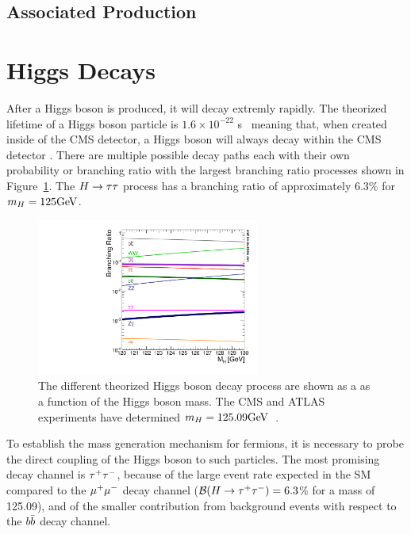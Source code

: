 \subsection{Associated Production}

\section{Higgs Decays}
\label{sec:higgs_decays}

After a Higgs boson is produced, it will decay extremly rapidly. The theorized lifetime of a Higgs
boson particle is $1.6 \times 10^{-22}$ s~\cite{Dittmaier:2012vm} meaning that, when created
inside of the CMS detector, a Higgs boson will always decay
within the CMS detector . There are multiple possible decay
paths each with their own probability or branching ratio with the largest branching ratio
processes shown in Figure~\ref{fig:higgs_decay}. The $H\to\tau\tau$ process has a branching
ratio of approximately 6.3\% for $m_{H} = 125\mathrm{GeV}$.


\begin{figure}[htbp]
\centering
     \includegraphics[width=0.65\textwidth]{phenomology_of_processes/plots/SMHiggsBR_YR4-square.pdf}
     \caption{
The different theorized Higgs boson decay process are shown as a 
as a function of the Higgs boson mass.
The CMS and ATLAS experiments have determined $m_{H} = 125.09\mathrm{GeV}$~\cite{Aad:2015zhl}.
     }
     \label{fig:higgs_decay}
\end{figure}


To establish the mass generation mechanism for fermions,
 it is necessary to probe the direct coupling of
the Higgs boson to such particles.
The most promising decay channel is $\tau^+\tau^-$,
because of the large event rate expected in the SM compared to the $\mu^+\mu^-$ decay channel ($\mathcal{B}(H\to\tau^+\tau^-)=6.3$\% for a mass of 125.09\GeV), and of the smaller contribution from background events
with respect to the $b\bar{b}$ decay channel.

